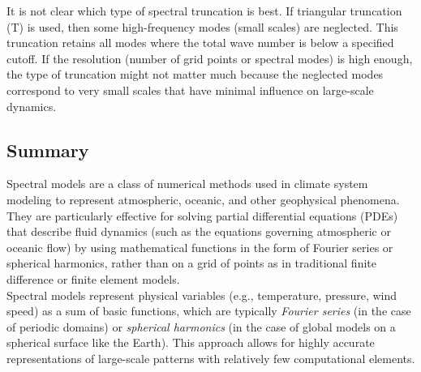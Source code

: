 It is not clear which type of spectral truncation is best. If triangular truncation (T) is used, then some high-frequency modes (small scales) are neglected. This truncation retains all modes where the total wave number is below a specified cutoff.  If the resolution (number of grid points or spectral modes) is high enough, the type of truncation might not matter much because the neglected modes correspond to very small scales that have minimal influence on large-scale dynamics.



\subsection{Summary}
Spectral models are a class of numerical methods used in climate system modeling to represent atmospheric, oceanic, and other geophysical phenomena. They are particularly effective for solving partial differential equations (PDEs) that describe fluid dynamics (such as the equations governing atmospheric or oceanic flow) by using mathematical functions in the form of Fourier series or spherical harmonics, rather than on a grid of points as in traditional finite difference or finite element models. \\

Spectral models represent physical variables (e.g., temperature, pressure, wind speed) as a sum of basic functions, which are typically \textit{Fourier series} (in the case of periodic domains) or \textit{spherical harmonics} (in the case of global models on a spherical surface like the Earth). This approach allows for highly accurate representations of large-scale patterns with relatively few computational elements.


